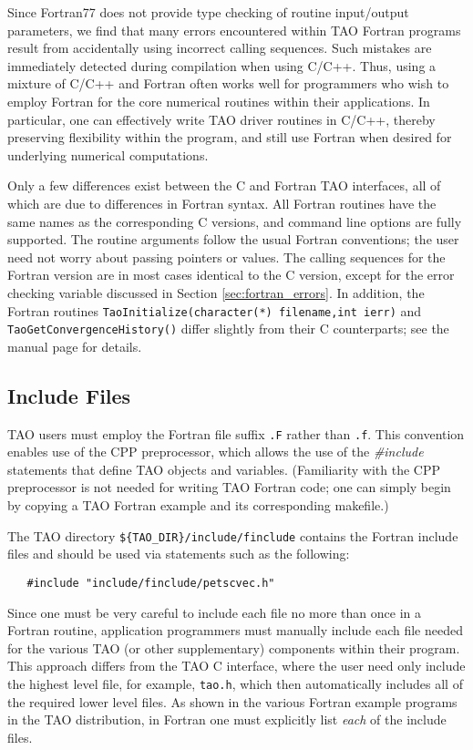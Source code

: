 Since Fortran77 does not provide type checking of routine input/output
parameters, we find that many errors encountered within TAO Fortran
programs result from accidentally using incorrect calling sequences.
Such mistakes are immediately detected during compilation when using
C/C++.  Thus, using a mixture of C/C++ and Fortran often works well
for programmers who wish to employ Fortran for the core numerical
routines within their applications.  In particular, one can
effectively write TAO driver routines in C/C++, thereby preserving
flexibility within the program, and still use Fortran when desired for
underlying numerical computations.


Only a few differences exist between the C and Fortran TAO interfaces,
all of which are due to differences in Fortran syntax.  All Fortran
routines have the same names as the corresponding C versions, and
command line options are fully supported. The routine arguments follow
the usual Fortran conventions; the user need not worry about passing
pointers or values.  The calling sequences for the Fortran version are
in most cases identical to the C version, except for the error
checking variable discussed in Section \ref{sec:fortran_errors}.  In
addition, the Fortran routines {\tt TaoInitialize(character(*) filename,int ierr)} and {\tt TaoGetConvergenceHistory()}
differ slightly from their C counterparts; see the manual page for
details.

\subsection{Include Files}
\label{sec:fortran_includes}

TAO users must employ the Fortran file suffix {\tt .F}
rather than {\tt .f}.  This convention enables use of the CPP
preprocessor, which allows the use of the {\em \#include} statements
that define TAO objects and variables. (Familiarity with the CPP
preprocessor is not needed for writing TAO Fortran code; one can
simply begin by copying a TAO Fortran example and its corresponding
makefile.)  

The TAO directory {\tt \$\{TAO\_DIR\}/include/finclude}
contains the Fortran include files
and should be used via statements 
such as the following:
\begin{verbatim}
   #include "include/finclude/petscvec.h"
\end{verbatim}
\noindent
Since one must be very careful to include each file no more than once
in a Fortran routine, application programmers must manually include
each file needed for the various TAO (or other supplementary)
components within their program.  This approach differs from the TAO
C interface, where the user need only include the highest level
file, for example, {\tt tao.h}, which then automatically
includes all of the required lower level files.  As shown in the
various Fortran example programs in the TAO distribution, in Fortran
one must explicitly list {\em each} of the include files.


